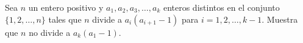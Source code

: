 Sea $n$ un entero positivo y $a_1,a_2,a_3,\ldots,a_k$ enteros distintos en el conjunto $\{ 1,2,\ldots,n\}$ tales que $n$ divide a $a_i(a_{i + 1} - 1)$ para $i=1,2,\ldots,k-1$. Muestra que $n$ no divide a $a_k(a_1-1)$.